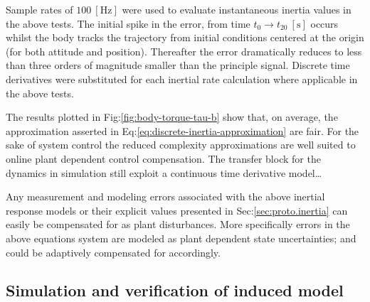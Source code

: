 \par
Sample rates of $100~[\text{Hz}]$ were used to evaluate instantaneous inertia values in the above tests. The initial spike in the error, from time $t_0\rightarrow t_{20}~[\text{s}]$ occurs whilst the body tracks the trajectory from initial conditions centered at the origin (for both attitude and position). Thereafter the error dramatically reduces to less than three orders of magnitude smaller than the principle signal. Discrete time derivatives were substituted for each inertial rate calculation where applicable in the above tests. 
\par
The results plotted in Fig:\ref{fig:body-torque-tau-b} show that, on average, the approximation asserted in Eq:\ref{eq:discrete-inertia-approximation} are fair. For the sake of system control the reduced complexity approximations are well suited to online plant dependent control compensation. The transfer block for the dynamics in simulation still exploit a continuous time derivative model\ldots
\par
Any measurement and modeling errors associated with the above inertial response models or their explicit values presented in Sec:\ref{sec:proto.inertia} can easily be compensated for as plant disturbances. More specifically errors in the above equations system are modeled as plant dependent state uncertainties; and could be adaptively compensated for accordingly.
\subsection{Simulation and verification of induced model}
\label{subsec:dynamics.nonlinearities.torque-tests}
